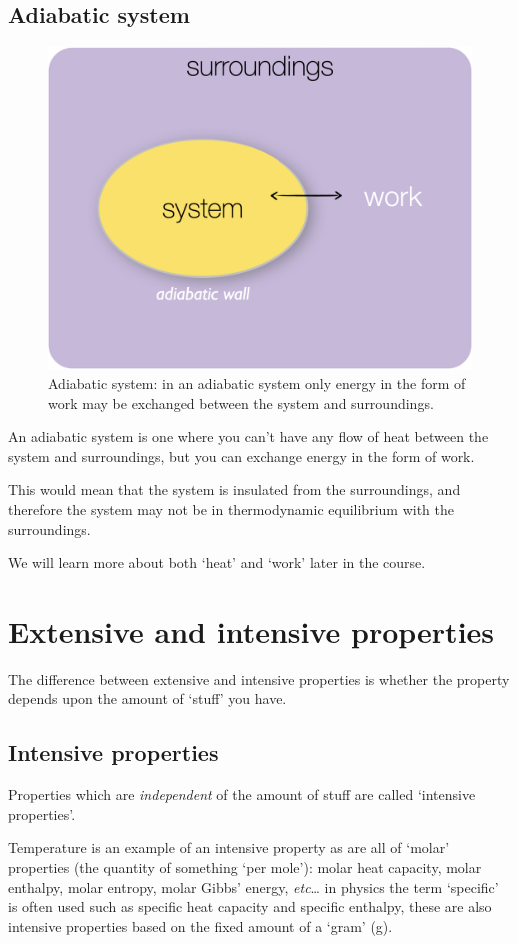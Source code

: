 \documentclass[
]{book}
\begin{document}
\hypertarget{subsec:adiabatic}{%
\subsection{Adiabatic system}\label{subsec:adiabatic}}

\begin{figure}

{\centering \includegraphics[width=0.3\linewidth]{images/adiabatic} 

}

\caption{Adiabatic system: in an adiabatic system only energy in the form of work may be exchanged between the system and surroundings.}\label{fig:adiabatic}
\end{figure}

An adiabatic system is one where you can't have any flow of heat between the system and surroundings, but you can exchange energy in the form of work.

This would mean that the system is insulated from the surroundings, and therefore the system may not be in thermodynamic equilibrium with the surroundings.

We will learn more about both `heat' and `work' later in the course.

\hypertarget{sec:extensiveintensive}{%
\section{Extensive and intensive properties}\label{sec:extensiveintensive}}

The difference between extensive and intensive properties is whether the property depends upon the amount of `stuff' you have.

\hypertarget{sec:intenstive}{%
\subsection{Intensive properties}\label{sec:intenstive}}

Properties which are \emph{independent} of the amount of stuff are called `intensive properties'.

Temperature is an example of an intensive property as are all of `molar' properties (the quantity of something `per mole'): molar heat capacity, molar enthalpy, molar entropy, molar Gibbs' energy, \emph{etc}\ldots{} in physics the term `specific' is often used such as specific heat capacity and specific enthalpy, these are also intensive properties based on the fixed amount of a `gram' (g).
\end{document}
